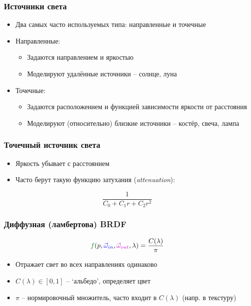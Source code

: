 \documentclass{beamer}
\begin{document}
\begin{frame}[fragile]
\frametitle{Источники света}
\begin{itemize}
\item Два самых часто используемых типа: направленные и точечные
\pause
\item Направленные:
\pause
\begin{itemize}
\item Задаются направлением и яркостью
\pause
\item Моделируют удалённые источники -- солнце, луна
\end{itemize}
\pause
\item Точечные:
\pause
\begin{itemize}
\item Задаются расположением и функцией зависимости яркости от расстояния
\pause
\item Моделируют (относительно) близкие источники -- костёр, свеча, лампа
\end{itemize}
\end{itemize}
\end{frame}

\begin{frame}[fragile]
\frametitle{Точечный источник света}
\begin{itemize}
\item Яркость убывает с расстоянием
\pause
\item Часто берут такую функцию затухания (\textit{attenuation}):
\end{itemize}
\begin{equation*}
\frac{1}{C_0 + C_1 r + C_2 r^2}
\end{equation*}
\end{frame}

\begin{frame}[fragile]
\frametitle{Диффузная (ламбертова) BRDF}
\begin{equation*}
{\color{green}f}(p, {\color{blue}\vec\omega_{in}}, {\color{magenta}\vec\omega_{out}}, \lambda) = \frac{C(\lambda)}{\pi}
\end{equation*}
\begin{itemize}
\item Отражает свет во всех направлениях одинаково
\item \begin{math}C(\lambda) \in [0, 1]\end{math} -- `альбедо', определяет цвет
\item \begin{math}\pi\end{math} -- нормировочный множитель, часто входит в \begin{math}C(\lambda)\end{math} (напр. в текстуру)
\end{itemize}
\end{frame}
\end{document}
